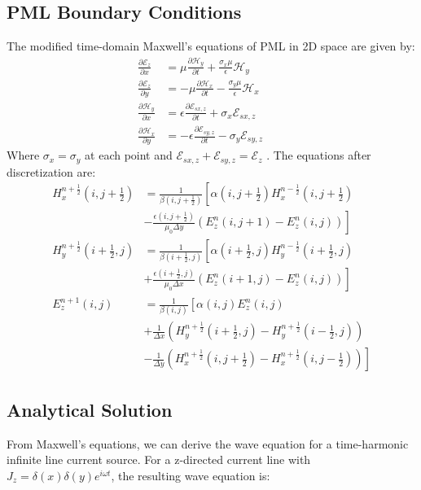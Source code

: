 \documentclass[journal]{IEEEtran}
\begin{document}
\subsection{PML Boundary Conditions}
The modified time-domain Maxwell’s equations of PML in 2D space are given by:
\begin{align}
\frac{\partial \mathcal{E}_z}{\partial x} &= \mu \frac{\partial \mathcal{H}_y}{\partial t} + \frac{\sigma_x \mu}{\epsilon} \mathcal{H}_y \qquad  \\
\frac{\partial \mathcal{E}_z}{\partial y} &= -\mu \frac{\partial \mathcal{H}_x}{\partial t} - \frac{\sigma_y \mu}{\epsilon} \mathcal{H}_x \qquad \\
\frac{\partial \mathcal{H}_y}{\partial x} &= \epsilon \frac{\partial \mathcal{E}_{sx,z}}{\partial t} + \sigma_x \mathcal{E}_{sx,z} \qquad  \\
\frac{\partial \mathcal{H}_x}{\partial y} &= -\epsilon \frac{\partial \mathcal{E}_{sy,z}}{\partial t} - \sigma_y \mathcal{E}_{sy,z} \qquad 
\end{align}
Where $\sigma_x=\sigma_y$ at each point and $\mathcal{E}_{sx,z}+\mathcal{E}_{sy,z}=\mathcal{E}_{z} $ .
The equations after discretization are{\cite{jin2015theory}}:
\begin{align}
H_x^{n+\frac{1}{2}}(i,j+\frac{1}{2}) &= \frac{1}{\beta(i,j+\frac{1}{2})}\left[\alpha(i,j+\frac{1}{2}) H_x^{n-\frac{1}{2}}(i,j+\frac{1}{2}) \right. \nonumber \\
&\left. - \frac{\epsilon(i,j+\frac{1}{2})}{\mu_0 \Delta y}\left(E_z^n(i,j+1) - E_z^n(i,j)\right)\right] \\
H_y^{n+\frac{1}{2}}(i+\frac{1}{2},j) &= \frac{1}{\beta(i+\frac{1}{2},j)}\left[\alpha(i+\frac{1}{2},j) H_y^{n-\frac{1}{2}}(i+\frac{1}{2},j) \right. \nonumber \\
&\left. + \frac{\epsilon(i+\frac{1}{2},j)}{\mu_0 \Delta x}\left(E_z^n(i+1,j) - E_z^n(i,j)\right)\right] \\
E_z^{n+1}(i,j) &= \frac{1}{\beta(i,j)}\left[\alpha(i,j) E_z^n(i,j) \right. \nonumber \\
&\left. + \frac{1}{\Delta x}\left(H_y^{n+\frac{1}{2}}(i+\frac{1}{2},j) - H_y^{n+\frac{1}{2}}(i-\frac{1}{2},j)\right) \right. \nonumber \\
&\left. - \frac{1}{\Delta y}\left(H_x^{n+\frac{1}{2}}(i,j+\frac{1}{2}) - H_x^{n+\frac{1}{2}}(i,j-\frac{1}{2})\right)\right]
\end{align}

\subsection{Analytical Solution}
From Maxwell's equations, we can derive the wave equation for a time-harmonic infinite line current source. For a z-directed current line with $J_z = \delta(x)\delta(y)e^{i\omega t}$, the resulting wave equation is:
\end{document}
